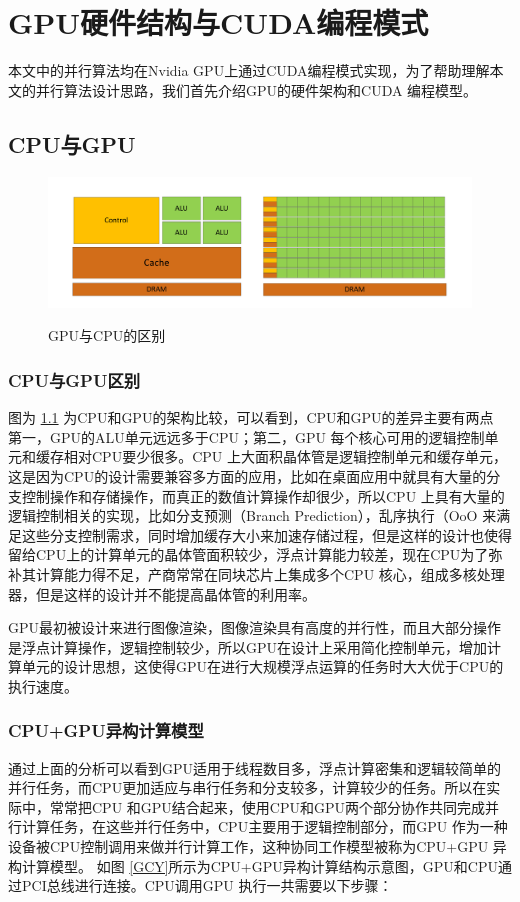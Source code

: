 \chapter{GPU硬件结构与CUDA编程模式}
本文中的并行算法均在Nvidia GPU上通过CUDA编程模式实现，为了帮助理解本文的并行算法设计思路，我们首先介绍GPU的硬件架构和CUDA 编程模型。
\section{CPU与GPU}
\begin{figure}
\setlength{\belowcaptionskip}{-0.5cm}
  \begin{center}
    {\includegraphics[width=1 \textwidth]{figures/GPU&CPU.pdf}}
    \end{center}
  \caption{{\footnotesize{GPU与CPU的区别}}}
  \label{GCD}
\end{figure}
\subsection{CPU与GPU区别}

图为 \ref{GCD} 为CPU和GPU的架构比较，可以看到，CPU和GPU的差异主要有两点 第一，GPU的ALU单元远远多于CPU；第二，GPU 每个核心可用的逻辑控制单元和缓存相对CPU要少很多。CPU 上大面积晶体管是逻辑控制单元和缓存单元，这是因为CPU的设计需要兼容多方面的应用，比如在桌面应用中就具有大量的分支控制操作和存储操作，而真正的数值计算操作却很少，所以CPU 上具有大量的逻辑控制相关的实现，比如分支预测（Branch Prediction），乱序执行（OoO 来满足这些分支控制需求，同时增加缓存大小来加速存储过程，但是这样的设计也使得留给CPU上的计算单元的晶体管面积较少，浮点计算能力较差，现在CPU为了弥补其计算能力得不足，产商常常在同块芯片上集成多个CPU 核心，组成多核处理器，但是这样的设计并不能提高晶体管的利用率。

GPU最初被设计来进行图像渲染，图像渲染具有高度的并行性，而且大部分操作是浮点计算操作，逻辑控制较少，所以GPU在设计上采用简化控制单元，增加计算单元的设计思想，这使得GPU在进行大规模浮点运算的任务时大大优于CPU的执行速度。
\subsection{CPU+GPU异构计算模型}
通过上面的分析可以看到GPU适用于线程数目多，浮点计算密集和逻辑较简单的并行任务，而CPU更加适应与串行任务和分支较多，计算较少的任务。所以在实际中，常常把CPU 和GPU结合起来，使用CPU和GPU两个部分协作共同完成并行计算任务，在这些并行任务中，CPU主要用于逻辑控制部分，而GPU 作为一种设备被CPU控制调用来做并行计算工作，这种协同工作模型被称为CPU+GPU 异构计算模型。
如图 \ref{GCY}所示为CPU+GPU异构计算结构示意图，GPU和CPU通过PCI总线进行连接。CPU调用GPU 执行一共需要以下步骤：

